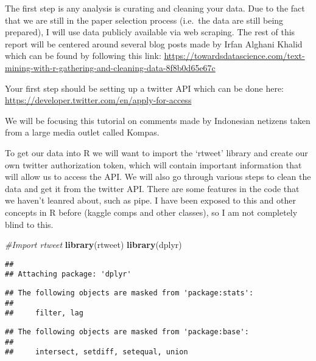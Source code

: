 \documentclass[
]{article}
\newenvironment{Shaded}{\begin{snugshade}}{\end{snugshade}}
\newcommand{\CommentTok}[1]{\textcolor[rgb]{0.56,0.35,0.01}{\textit{#1}}}
\newcommand{\KeywordTok}[1]{\textcolor[rgb]{0.13,0.29,0.53}{\textbf{#1}}}
\newcommand{\NormalTok}[1]{#1}
\begin{document}
The first step is any analysis is curating and cleaning your data. Due
to the fact that we are still in the paper selection process (i.e.~the
data are still being prepared), I will use data publicly available via
web scraping. The rest of this report will be centered around several
blog posts made by Irfan Alghani Khalid which can be found by following
this link:
\url{https://towardsdatascience.com/text-mining-with-r-gathering-and-cleaning-data-8f8b0d65e67c}

Your first step should be setting up a twitter API which can be done
here: \url{https://developer.twitter.com/en/apply-for-access}

We will be focusing this tutorial on comments made by Indonesian
netizens taken from a large media outlet called Kompas.

To get our data into R we will want to import the `rtweet' library and
create our own twitter authorization token, which will contain important
information that will allow us to access the API. We will also go
through various steps to clean the data and get it from the twitter API.
There are some features in the code that we haven't leanred about, such
as pipe. I have been exposed to this and other concepts in R before
(kaggle comps and other classes), so I am not completely blind to this.

\begin{Shaded}
\begin{Highlighting}[]
\CommentTok{#Import rtweet}
\KeywordTok{library}\NormalTok{(rtweet)}
\KeywordTok{library}\NormalTok{(dplyr)}
\end{Highlighting}
\end{Shaded}

\begin{verbatim}
## 
## Attaching package: 'dplyr'
\end{verbatim}

\begin{verbatim}
## The following objects are masked from 'package:stats':
## 
##     filter, lag
\end{verbatim}

\begin{verbatim}
## The following objects are masked from 'package:base':
## 
##     intersect, setdiff, setequal, union
\end{verbatim}
\end{document}
